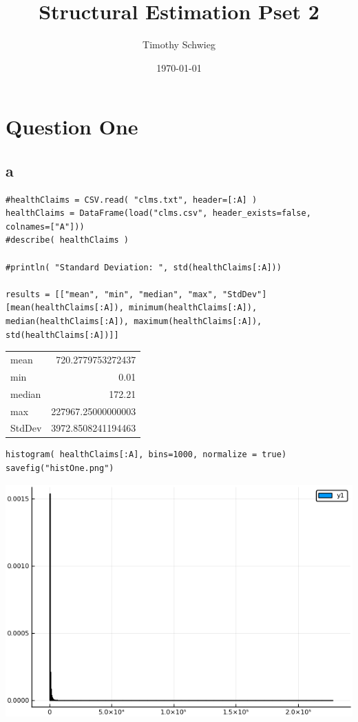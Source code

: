 \documentclass[12pt, letterpaper]{paper}
\author{Timothy Schwieg}
\date{\today}
\title{Structural Estimation Pset 2}
\begin{document}
\maketitle

\section{Question One}
\label{sec:org9967813}
\subsection{a}
\label{sec:org28ccc09}
\begin{verbatim}
#healthClaims = CSV.read( "clms.txt", header=[:A] )
healthClaims = DataFrame(load("clms.csv", header_exists=false, colnames=["A"]))
#describe( healthClaims )

#println( "Standard Deviation: ", std(healthClaims[:A]))

results = [["mean", "min", "median", "max", "StdDev"] [mean(healthClaims[:A]), minimum(healthClaims[:A]), median(healthClaims[:A]), maximum(healthClaims[:A]), std(healthClaims[:A])]]
\end{verbatim}

\begin{center}
\begin{tabular}{lr}
mean & 720.2779753272437\\
min & 0.01\\
median & 172.21\\
max & 227967.25000000003\\
StdDev & 3972.8508241194463\\
\end{tabular}
\end{center}

\begin{verbatim}
histogram( healthClaims[:A], bins=1000, normalize = true)
savefig("histOne.png")
\end{verbatim}

\begin{center}
\includegraphics[width=.9\linewidth]{histOne.png}
\end{center}
\end{document}
